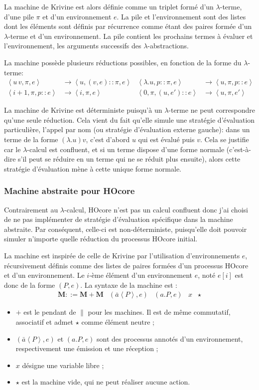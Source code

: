 \documentclass[11pt]{article}
\newcommand{\krivine}[1]{\left\langle{#1}\right\rangle}
\newcommand{\send}[2]{\bar{#1}\left\langle #2\right\rangle}
\newcommand{\block}[1]{\left[#1\right]}
\begin{document}
La machine de Krivine est alors définie comme un triplet formé d'un $\lambda$-terme, d'une pile $\pi$ et d'un environnement $e$.
La pile et l'environnement sont des listes dont les éléments sont définis par récurrence comme étant des paires formée d'un $\lambda$-terme et d'un environnement.
La pile contient les prochains termes à évaluer et l'environnement, les arguments successifs des $\lambda$-abstractions.

La machine possède plusieurs réductions possibles, en fonction de la forme du $\lambda$-terme:
\begin{align*}
	\krivine{u\, v,\pi,e} & \to \krivine{u, (v,e)::\pi,e}
	& \krivine{\lambda.u,p::\pi,e} &\to \krivine{u,\pi,p::e} \\
	\krivine{i+1,\pi,p::e} & \to \krivine{i,\pi,e}
	& \krivine{0,\pi,(u,e')::e} & \to \krivine{u,\pi,e'}
\end{align*}

La machine de Krivine est déterministe puisqu'à un $\lambda$-terme ne peut correspondre qu'une seule réduction.
Cela vient du fait qu'elle simule une stratégie d'évaluation particulière, l'appel par nom (ou stratégie d'évaluation externe gauche): dans un terme de la forme $(\lambda.u) v$, c'est d'abord $u$ qui est évalué puis $v$.
Cela se justifie car le $\lambda$-calcul est confluent, et si un terme dispose d'une forme normale (c'est-à-dire s'il peut se réduire en un terme qui ne se réduit plus ensuite), alors cette stratégie d'évaluation mène à cette unique forme normale.

\subsubsection{Machine abstraite pour HOcore}
\label{sec-3-1-2}

Contrairement au $\lambda$-calcul, HOcore n'est pas un calcul confluent donc j'ai choisi de ne pas implémenter de stratégie d'évaluation spécifique dans la machine abstraite.
Par conséquent, celle-ci est non-déterministe, puisqu'elle doit pouvoir simuler n'importe quelle réduction du processus HOcore initial.

La machine est inspirée de celle de Krivine par l'utilisation d'environnements $e$, récursivement définis comme des listes de paires formées d'un processus HOcore et d'un environnement. Le $i$-ème élément d'un environnement $e$, noté $e\block{i}$ est donc de la forme $(P,e)$. La syntaxe de la machine est :
\[\begin{array}{c|c|c|c|c}\mathbf{M}::= \mathbf{M} + \mathbf{M} & (\send{a}P,e) & (a.P,e) & x & \star\end{array}\]
\begin{itemize}
	\item $+$ est le pendant de $\parallel$ pour les machines. Il est de même commutatif, associatif et admet $\star$ comme élément neutre ;
	\item $(\send{a}P,e)$ et $(a.P,e)$ sont des processus annotés d'un environnement, respectivement une émission et une réception ;
	\item $x$ désigne une variable libre ;
	\item $\star$ est la machine vide, qui ne peut réaliser aucune action.
\end{itemize}
\end{document}
